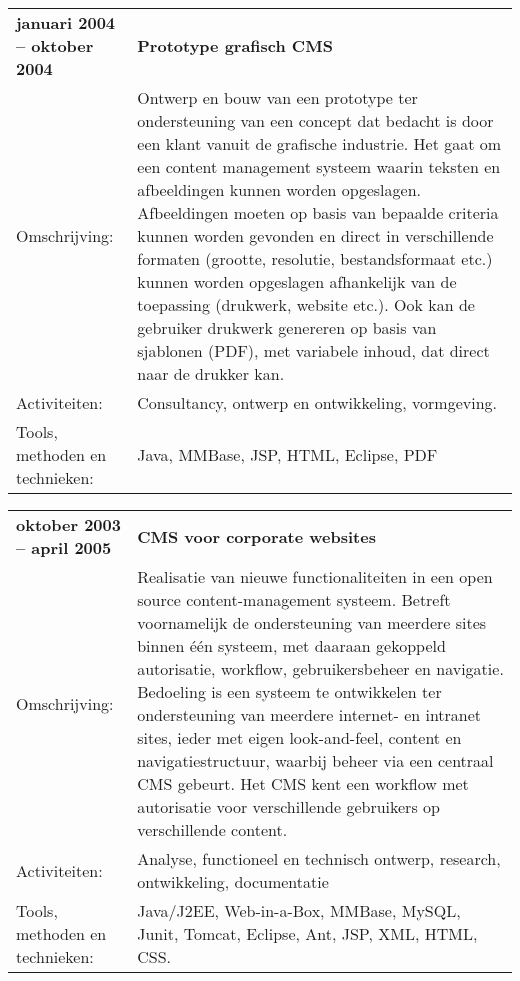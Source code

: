 \documentclass[a4paper]{article}
\newcommand{\mysql}{My\-SQL}
\newcommand{\omschrijving}{Omschrijving:}
\newcommand{\activiteiten}{Activiteiten:}
\newcommand{\tools}{Tools, methoden en technieken:}
\newcommand{\tabelh}[1]{\textbf{#1}}
\begin{document}
        \begin{tabular}{l p{10cm}}
            \tabelh{januari 2004 -- oktober 2004} & \tabelh{Prototype grafisch
            CMS} \\
            \omschrijving &
            Ontwerp en bouw van een prototype ter ondersteuning van een concept dat
            bedacht is door een klant vanuit de grafische industrie. Het gaat om een
            content management systeem waarin teksten en afbeeldingen kunnen worden
            opgeslagen. Afbeeldingen moeten op basis van bepaalde criteria kunnen worden
            gevonden en direct in verschillende formaten (grootte, resolutie,
            bestandsformaat etc.) kunnen worden opgeslagen afhankelijk van de toepassing
            (drukwerk, website etc.). Ook kan de gebruiker drukwerk genereren op basis van
            sjablonen (PDF), met variabele inhoud, dat direct naar de drukker
            kan. \\
            \activiteiten &
            Consultancy, ontwerp en ontwikkeling, vormgeving. \\
            \tools &
            Java,  MMBase, JSP, HTML, Eclipse, PDF \\
        \end{tabular}
       
        \medskip
        
        \begin{tabular}{l p{10cm}}
            \tabelh{oktober 2003 -- april 2005} & \tabelh{CMS voor corporate
            websites} \\
            \omschrijving &
            Realisatie van nieuwe functionaliteiten in een open source content-management
            systeem. Betreft voornamelijk de ondersteuning van meerdere sites binnen één
            systeem, met daaraan gekoppeld autorisatie, workflow, gebruikersbeheer en
            navigatie. Bedoeling is een systeem te ontwikkelen ter ondersteuning van
            meerdere internet- en intranet sites, ieder met eigen look-and-feel, content
            en navigatiestructuur, waarbij beheer via een centraal CMS gebeurt. Het CMS
            kent een workflow met autorisatie voor verschillende gebruikers op
            verschillende content. \\
            \activiteiten &
            Analyse, functioneel en technisch ontwerp, research, ontwikkeling,
            documentatie \\
            \tools &
            Java/J2EE, Web-in-a-Box, MMBase, \mysql, Junit, Tomcat, Eclipse,
            Ant, JSP, XML, HTML, CSS. \\
        \end{tabular}
\end{document}
